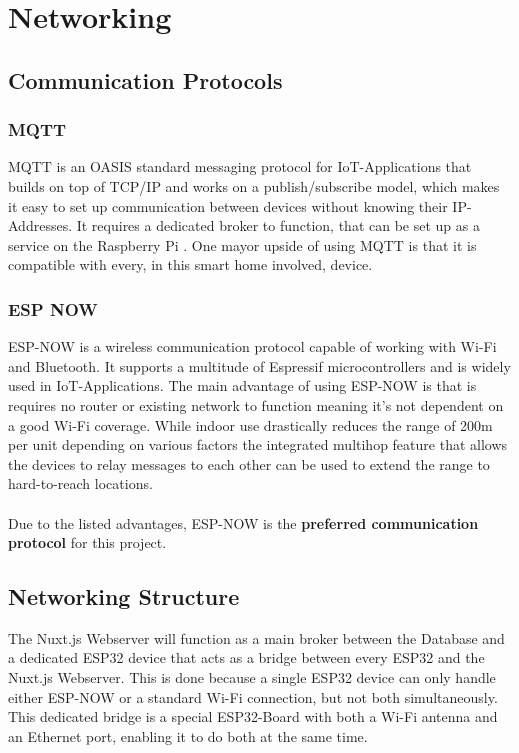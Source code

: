 \chapter{Networking}
\section{Communication Protocols}
    \subsection{MQTT}
    MQTT is an OASIS standard messaging protocol for 
    IoT-Applications that builds on top of TCP/IP and 
    works on a publish/subscribe model, which makes it easy
    to set up communication between devices without knowing
    their IP-Addresses. It requires a dedicated broker to
    function, that can be set up as a service on the 
    Raspberry Pi \cite{mqtt_nodate}.
    One mayor upside of using MQTT is that it is compatible
    with every, in this smart home involved, device.


    \subsection{ESP NOW} 
    ESP-NOW is a wireless communication protocol capable of
    working with Wi-Fi and Bluetooth. It supports a 
    multitude of Espressif microcontrollers and is widely 
    used in IoT-Applications. The main advantage of using
    ESP-NOW is that is requires no router or existing
    network to function meaning it's not dependent on
    a good Wi-Fi coverage. While indoor use drastically
    reduces the range of 200m per unit depending on various
    factors \cite{esp-now-reach_2024} 
    the integrated multihop feature that allows the devices 
    to relay messages to each other can be used to extend 
    the range to hard-to-reach locations.\\~\\
    Due to the listed advantages, ESP-NOW is the \textbf{preferred
    communication protocol} for this project.

\section{Networking Structure}
The Nuxt.js Webserver will function as a main broker between
the Database and a dedicated ESP32 device that  acts
as a bridge between every ESP32 and the Nuxt.js Webserver.
This is done because a single ESP32 device can only handle
either ESP-NOW or a standard Wi-Fi connection, but not both
simultaneously. This dedicated bridge is a special 
ESP32-Board with both a Wi-Fi antenna and an Ethernet port,
enabling it to do both at the same time. 

